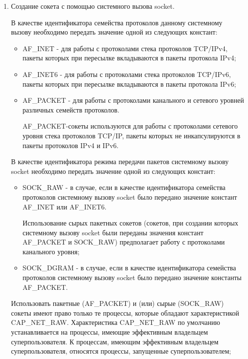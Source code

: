 	\begin{enumerate}

		\item Создание сокета с помощью системного вызова socket.

			В качестве идентификатора семейства протоколов данному системному вызову необходимо передать значение одной из следующих констант:

			\begin{itemize}

				\item AF\_INET - для работы с протоколами стека протоколов TCP/IPv4, пакеты которых при пересылке вкладываются в пакеты протокола IPv4;
				\item AF\_INET6 - для работы с протоколами стека протоколов TCP/IPv6, пакеты которых при пересылке вкладываются в пакеты протокола IPv6;
				\item AF\_PACKET - для работы с протоколами канального и сетевого уровней различных семейств протоколов.

					AF\_PACKET-сокеты используются для работы с протоколами сетевого уровня стека протоколов TCP/IP,
					пакеты которых не инкапсулируются в пакеты протоколов IPv4 и IPv6.

			\end{itemize}

			В качестве идентификатора режима передачи пакетов системному вызову socket необходимо передать значение одной из следующих констант:

			\begin{itemize}

				\item SOCK\_RAW - в случае, если в качестве идентификатора семейства протоколов системному вызову socket было передано значение констант
				AF\_INET или AF\_INET6.

					Использование сырых пакетных сокетов (сокетов, при создании которых системному вызову socket были переданы значения констант AF\_PACKET
					и SOCK\_RAW) предполагает работу с протоколами канального уровня;

				\item SOCK\_DGRAM - в случае, если в качестве идентификатора семейства протоколов системному вызову socket было передано значение константы
				AF\_PACKET.

			\end{itemize}

			Использовать пакетные (AF\_PACKET) и (или) сырые (SOCK\_RAW) сокеты имеют право только те процессы, которые обладают характеристикой CAP\_NET\_RAW.
			Характеристика CAP\_NET\_RAW по умолчанию устанавливается на процессы, имеющие эффективным владельцем суперпользователя.
			К процессам, имеющим эффективным владельцем суперпользователя, относятся процессы, запущенные суперпользователем;


\end{enumerate}
